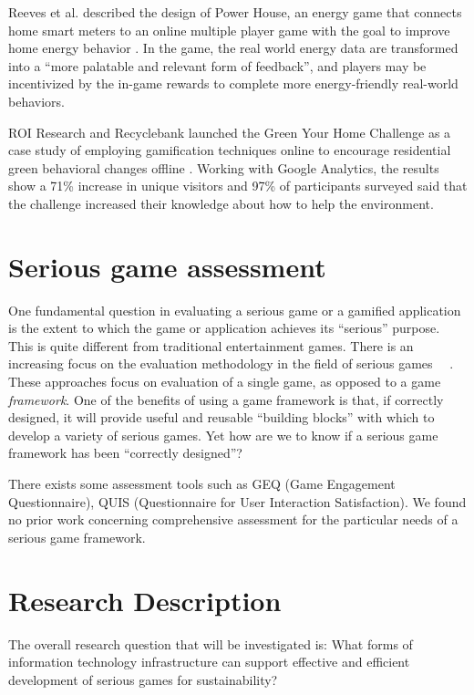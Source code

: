 Reeves et al. described the design of Power House, an energy game that connects
home smart meters to an online multiple player game with the goal to improve
home energy behavior \cite{Reeves2011powerhouse}. In the game, the real world
energy data are transformed into a ``more palatable and relevant form of
feedback'', and players may be incentivized by the in-game rewards to complete
more energy-friendly real-world behaviors.

ROI Research and Recyclebank launched the Green Your Home Challenge as a case
study of employing gamification techniques online to
encourage residential green behavioral changes offline \cite{gamingforgood}.
Working with Google Analytics, the results show a 71\% increase in unique
visitors and 97\% of participants surveyed said that the challenge increased
their knowledge about how to help the environment.

\section{Serious game assessment}

One fundamental question in evaluating a serious game or a gamified application is the 
extent to which the game or application achieves its ``serious'' purpose. This is quite different from traditional entertainment games. There is an increasing
focus on the evaluation methodology in the field of serious games ~\cite{Mayer2012233}~\cite{harteveld2010triadic}. These approaches focus on evaluation of a single game, as opposed to a game {\em
  framework}. One of the benefits of 
using a game framework is that, if correctly designed, it will provide useful and
reusable ``building blocks'' with which to develop a variety of serious games. Yet how are we to know if a serious
game framework has been ``correctly designed''?

There exists some assessment tools such as GEQ (Game Engagement Questionnaire)\cite{brockmyer2009development}, QUIS (Questionnaire for User Interaction Satisfaction)\cite{harper1993improving}. We found no prior work concerning comprehensive assessment for 
the particular needs of a serious game framework.

\section{Research Description}

The overall research question that will be investigated is:
What forms of information technology infrastructure can support effective and efficient development of serious games for sustainability?


